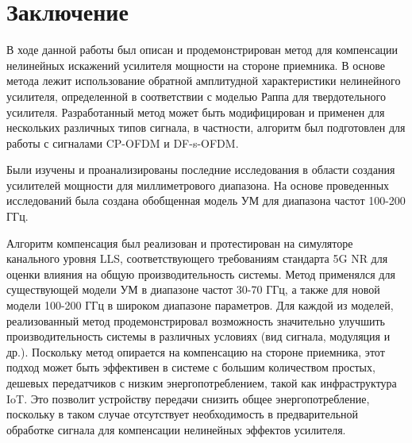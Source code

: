 \section{Заключение}

В ходе данной работы был описан и продемонстрирован метод для компенсации
нелинейных искажений усилителя мощности на стороне приемника. В основе
метода лежит использование обратной амплитудной характеристики нелинейного
усилителя, определенной в соответствии с моделью Раппа для твердотельного
усилителя. Разработанный метод может быть модифицирован и применен для
нескольких различных типов сигнала, в частности, алгоритм был подготовлен
для работы с сигналами CP-OFDM и DF-s-OFDM.

Были изучены и проанализированы последние исследования в области создания
усилителей мощности для миллиметрового диапазона. На основе проведенных
исследований была создана обобщенная модель УМ для диапазона частот 100-200
ГГц.

Алгоритм компенсация был реализован и протестирован на симуляторе
канального уровня LLS, соответствующего требованиям стандарта 5G NR для
оценки влияния на общую производительность системы. Метод применялся для
существующей модели УМ в диапазоне частот 30-70 ГГц, а также для новой
модели 100-200 ГГц в широком диапазоне параметров. Для каждой из моделей,
реализованный метод продемонстрировал возможность значительно улучшить
производительность системы в различных условиях (вид сигнала, модуляция и
др.). Поскольку метод опирается на компенсацию на стороне приемника, этот
подход может быть эффективен в системе с большим количеством простых,
дешевых передатчиков с низким энергопотреблением, такой как инфраструктура
IoT. Это позволит устройству передачи снизить общее энергопотребление,
поскольку в таком случае отсутствует необходимость в предварительной
обработке сигнала для компенсации нелинейных эффектов усилителя.